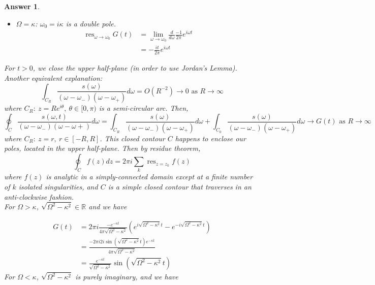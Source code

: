 \documentclass[a4paper]{article}
\DeclareMathOperator{\res}{res}
\newtheorem{ans}{Answer}[section]
\theoremstyle{new}
\begin{document}
\begin{ans}
\begin{enumerate}[label=(\alph*)]
\begin{itemize}
\begin{align}
    \end{align}
    \item $\Omega=\kappa$: $\omega_0=i\kappa$ is a double pole.
    \begin{align}
        \res_{\omega\rightarrow\omega_0}G(t)&=\lim_{\omega\rightarrow\omega_0}\frac{d}{d\omega}\frac{-1}{2\pi}e^{i\omega t}\nonumber\\&=-\frac{it}{2\pi}e^{i\omega t}\nonumber
    \end{align}
\end{itemize}
For $t>0$, we close the upper half-plane (in order to use Jordan's Lemma). Another equivalent explanation:
$$\int_{C_R}\frac{s(\omega)}{(\omega-\omega_-)(\omega-\omega_+)}d\omega=O(R^{-2})\rightarrow0\text{ as }R\rightarrow\infty$$
where $C_R:~z=Re^{i\theta},~\theta\in[0,\pi)$ is a semi-circular arc. Then,
$$\oint_C\frac{s(\omega,t)}{(\omega-\omega_-)(\omega-\omega+)}d\omega=\int_{C_R}\frac{s(\omega)}{(\omega-\omega_-)(\omega-\omega_+)}d\omega+\int_{C_0}\frac{s(\omega)}{(\omega-\omega_-)(\omega-\omega_+)}d\omega\rightarrow G(t)\text{ as } R\rightarrow \infty$$
where $C_R:~z=r,~r\in[-R,R]$. This closed contour $C$ happens to enclose our poles, located in the upper half-plane. Then by residue theorem,
$$\oint_Cf(z)dz=2\pi i\sum_k\res_{z=z_k}f(z)$$
where $f(z)$ is analytic in a simply-connected domain except at a finite number of $k$ isolated singularities, and $C$ is a simple closed contour that traverses in an anti-clockwise fashion.\\[5pt]
For $\Omega>\kappa$, $\sqrt{\Omega^2-\kappa^2}\in\mathbb{R}$ and we have
\begin{center}
  \end{center}
\begin{align}
G(t)&=2\pi i\frac{-e^{-\kappa t}}{4\pi\sqrt{\Omega^2-\kappa^2}}(e^{i\sqrt{\Omega^2-\kappa^2}t}-e^{-i\sqrt{\Omega^2-\kappa^2}t})\nonumber\\&=\frac{-2\pi i2i\sin(\sqrt{\Omega^2-\kappa^2}t)e^{-\kappa t}}{4\pi\sqrt{\Omega^2-\kappa^2}}\nonumber\\&=\frac{e^{-\kappa t}}{\sqrt{\Omega^2-\kappa^2}}\sin(\sqrt{\Omega^2-\kappa^2}t)\nonumber
\end{align}
For $\Omega<\kappa$, $\sqrt{\Omega^2-\kappa^2}$ is purely imaginary, and we have
\begin{center}
\end{center}
\end{enumerate}
\end{ans}
\end{document}
